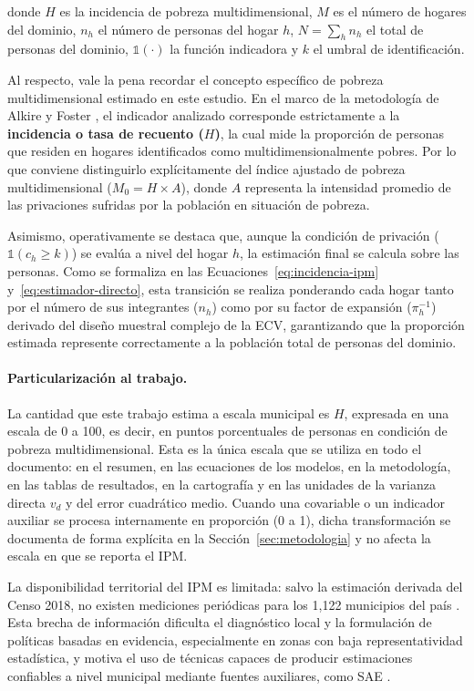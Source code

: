\noindent donde $H$ es la incidencia de pobreza multidimensional, $M$ es el número de hogares del dominio, $n_h$ el número de personas del hogar $h$, $N=\sum_h n_h$ el total de personas del dominio, $\mathbb{1}(\cdot)$ la función indicadora y $k$ el umbral de identificación.

Al respecto, vale la pena recordar el concepto específico de pobreza multidimensional estimado en este estudio. En el marco de la metodología de Alkire y Foster \cite{alkire2011}, el indicador analizado corresponde estrictamente a la \textbf{incidencia o tasa de recuento ($H$)}, la cual mide la proporción de personas que residen en hogares identificados como multidimensionalmente pobres. Por lo que conviene distinguirlo explícitamente del índice ajustado de pobreza multidimensional ($M_0 = H \times A$), donde $A$ representa la intensidad promedio de las privaciones sufridas por la población en situación de pobreza.

Asimismo, operativamente se destaca que, aunque la condición de privación ($\mathbb{1}(c_h \geq k)$) se evalúa a nivel del hogar $h$, la estimación final se calcula sobre las personas. Como se formaliza en las Ecuaciones~\ref{eq:incidencia-ipm} y~\ref{eq:estimador-directo}, esta transición se realiza ponderando cada hogar tanto por el número de sus integrantes ($n_h$) como por su factor de expansión ($\pi_h^{-1}$) derivado del diseño muestral complejo de la ECV, garantizando que la proporción estimada represente correctamente a la población total de personas del dominio.

\paragraph{Particularización al trabajo.}
La cantidad que este trabajo estima a escala municipal es $H$, expresada en una escala de 0 a 100, es decir, en puntos porcentuales de personas en condición de pobreza multidimensional. Esta es la única escala que se utiliza en todo el documento: en el resumen, en las ecuaciones de los modelos, en la metodología, en las tablas de resultados, en la cartografía y en las unidades de la varianza directa $v_d$ y del error cuadrático medio. Cuando una covariable o un indicador auxiliar se procesa internamente en proporción (0 a 1), dicha transformación se documenta de forma explícita en la Sección~\ref{sec:metodologia} y no afecta la escala en que se reporta el IPM.

La disponibilidad territorial del IPM es limitada: salvo la estimación derivada del Censo 2018, no existen mediciones periódicas para los 1{,}122 municipios del país \cite{DANE_PobrezaMultidimensional_2023}. Esta brecha de información dificulta el diagnóstico local y la formulación de políticas basadas en evidencia, especialmente en zonas con baja representatividad estadística, y motiva el uso de técnicas capaces de producir estimaciones confiables a nivel municipal mediante fuentes auxiliares, como SAE \cite{DANE_ProyectoSAE_2023}.

